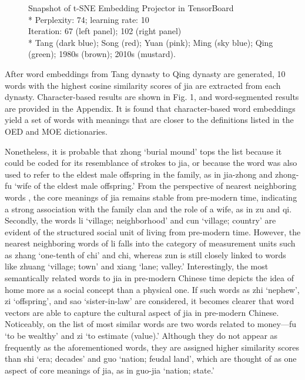 \begin{figure}[H]
\begin{minipage}[b]{0.45\linewidth}
\end{minipage}
\caption{Snapshot of t-SNE Embedding Projector in TensorBoard\\\footnotesize{* Perplexity: 74; learning rate: 10\\Iteration: 67 (left panel); 102 (right panel)\\* Tang (dark blue); Song (red); Yuan (pink); Ming (sky blue); Qing (green); 1980s (brown); 2010s (mustard).}}
\end{figure}

After word embeddings from Tang dynasty to Qing dynasty are generated, 10 words with the highest cosine similarity scores of jia are extracted from each dynasty. Character-based results are shown in Fig. 1, and word-segmented results are provided in the Appendix. It is found that character-based word embeddings yield a set of words with meanings that are closer to the definitions listed in the OED and MOE dictionaries.

Nonetheless, it is probable that zhong `burial mound' tops the list because it could be coded for its resemblance of strokes to jia, or because the word was also used to refer to the eldest male offspring in the family, as in jia-zhong and zhong-fu `wife of the eldest male offspring.' From the perspective of nearest neighboring words \parencite{hamilton2016cultural}, the core meanings of jia remains stable from pre-modern time, indicating a strong association with the family clan and the role of a wife, as in zu and qi. Secondly, the words li `village; neighborhood' and cun `village; country' are evident of the structured social unit of living from pre-modern time. However, the nearest neighboring words of li falls into the category of measurement units such as zhang `one-tenth of chi' and chi, whereas zun is still closely linked to words like zhuang `village; town' and xiang `lane; valley.' Interestingly, the most semantically related words to jia in pre-modern Chinese time depicts the idea of home more as a social concept than a physical one. If such words as zhi `nephew', zi `offspring', and sao `sister-in-law' are considered, it becomes clearer that word vectors are able to capture the cultural aspect of jia in pre-modern Chinese. 
Noticeably, on the list of most similar words are two words related to money—fu `to be wealthy' and zi `to estimate (value).' Although they do not appear as frequently as the aforementioned words, they are assigned higher similarity scores than shi `era; decades' and guo `nation; feudal land', which are thought of as one aspect of core meanings of jia, as in guo-jia `nation; state.'

